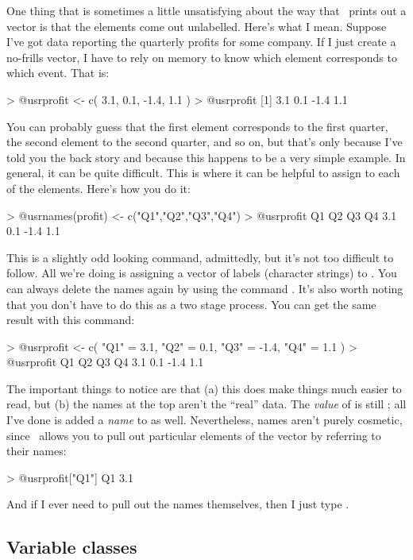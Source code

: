 One thing that is sometimes a little unsatisfying about the way that \R\ prints out a vector is that the elements come out unlabelled. Here's what I mean. Suppose I've got data reporting the quarterly profits for some company. If I just create a no-frills vector, I have to rely on memory to know which element corresponds to which event. That is:
\begin{rblock1}
> @usr{profit <- c( 3.1, 0.1, -1.4, 1.1 )}
> @usr{profit}
[1]  3.1  0.1 -1.4  1.1
\end{rblock1}
You can probably guess that the first element corresponds to the first quarter, the second element to the second quarter, and so on, but that's only because I've told you the back story and because this happens to be a very simple example. In general, it can be quite difficult. This is where it can be helpful to assign  to each of the elements. Here's how you do it:
\begin{rblock1}
> @usr{names(profit) <- c("Q1","Q2","Q3","Q4")}
> @usr{profit}
  Q1   Q2   Q3   Q4 
 3.1  0.1 -1.4  1.1 
\end{rblock1}
This is a slightly odd looking command, admittedly, but it's not too difficult to follow. All we're doing is assigning a vector of labels (character strings) to . You can always delete the names again by using the command . It's also worth noting that you don't have to do this as a two stage process. You can get the same result with this command:
\begin{rblock1}
> @usr{profit <- c( "Q1" = 3.1, "Q2" = 0.1, "Q3" = -1.4, "Q4" = 1.1 )}
> @usr{profit}
  Q1   Q2   Q3   Q4 
 3.1  0.1 -1.4  1.1 
 \end{rblock1}
The important things to notice are that (a) this does make things much easier to read, but (b) the names at the top aren't the ``real'' data. The {\it value} of  is still ; all I've done is added a {\it name} to  as well. Nevertheless, names aren't purely cosmetic, since \R\ allows you to pull out particular elements of the vector by referring to their names:
\begin{rblock1}
> @usr{profit["Q1"]}
 Q1 
3.1  
\end{rblock1}
And if I ever need to pull out the names themselves, then I just type . 

\subsection{Variable classes}

